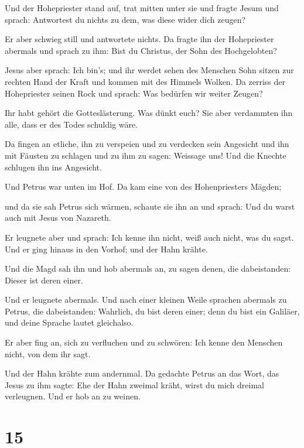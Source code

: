  Und der Hohepriester stand auf, trat mitten unter sie
und fragte Jesum und sprach: Antwortest du nichts zu dem, was diese
wider dich zeugen?

 Er aber schwieg still und antwortete nichts. Da fragte
ihn der Hohepriester abermals und sprach zu ihm: Bist du Christus, der
Sohn des Hochgelobten?

 Jesus aber sprach: Ich bin's; und ihr werdet sehen des
Menschen Sohn sitzen zur rechten Hand der Kraft und kommen mit des
Himmels Wolken.  Da zerriss der Hohepriester seinen Rock
und sprach: Was bedürfen wir weiter Zeugen?

 Ihr habt gehört die Gotteslästerung. Was dünkt euch? Sie
aber verdammten ihn alle, dass er des Todes schuldig wäre.

 Da fingen an etliche, ihn zu verspeien und zu verdecken
sein Angesicht und ihn mit Fäusten zu schlagen und zu ihm zu sagen:
Weissage uns! Und die Knechte schlugen ihn ins Angesicht.

 Und Petrus war unten im Hof. Da kam eine von des
Hohenpriesters Mägden;

 und da sie sah Petrus sich wärmen, schaute sie ihn an
und sprach: Und du warst auch mit Jesus von Nazareth.

 Er leugnete aber und sprach: Ich kenne ihn nicht, weiß
auch nicht, was du sagst. Und er ging hinaus in den Vorhof; und der Hahn
krähte.

 Und die Magd sah ihn und hob abermals an, zu sagen
denen, die dabeistanden: Dieser ist deren einer.

 Und er leugnete abermals. Und nach einer kleinen Weile
sprachen abermals zu Petrus, die dabeistanden: Wahrlich, du bist deren
einer; denn du bist ein Galiläer, und deine Sprache lautet gleichalso.

 Er aber fing an, sich zu verfluchen und zu schwören: Ich
kenne den Menschen nicht, von dem ihr sagt.

 Und der Hahn krähte zum andernmal. Da gedachte Petrus an
das Wort, das Jesus zu ihm sagte: Ehe der Hahn zweimal kräht, wirst du
mich dreimal verleugnen. Und er hob an zu weinen.

\hypertarget{section-14}{%
\section{15}\label{section-14}}

